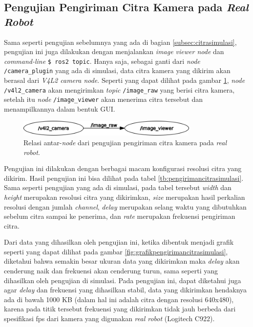 \subsection{Pengujian Pengiriman Citra Kamera pada \emph{Real Robot}}
\label{subsec:citrarobot}

Sama seperti pengujian sebelumnya yang ada di bagian \ref{subsec:citrasimulasi},
  pengujian ini juga dilakukan dengan menjalankan \emph{image viewer node} dan \emph{command-line} \lstinline{$ ros2 topic}.
Hanya saja, sebagai ganti dari \emph{node} \lstinline{/camera_plugin} yang ada di simulasi,
  data citra kamera yang dikirim akan berasal dari \emph{V4L2 camera node}.
Seperti yang dapat dilihat pada gambar \ref{fig:rosgraphcamera},
  \emph{node} \lstinline{/v4l2_camera} akan mengirimkan \emph{topic} \lstinline{/image_raw} yang berisi citra kamera,
  setelah itu \emph{node} \lstinline{/image_viewer} akan menerima citra tersebut dan menampilkannya dalam bentuk GUI.

\begin{figure}[ht]
  \centering
  \includegraphics[width=0.8\textwidth,keepaspectratio]{gambar/rosgraph-camera.png}
  \caption{Relasi antar-\emph{node} dari pengujian pengiriman citra kamera pada \emph{real robot}.}
  \label{fig:rosgraphcamera}
\end{figure}

Pengujian ini dilakukan dengan berbagai macam konfigurasi resolusi citra yang dikirim.
Hasil pengujian ini bisa dilihat pada tabel \ref{tb:pengirimancitrasimulasi}.
Sama seperti pengujian yang ada di simulasi, pada tabel tersebut \emph{width} dan \emph{height} merupakan resolusi citra yang dikirimkan,
  \emph{size} merupakan hasil perkalian resolusi dengan jumlah \emph{channel},
  \emph{delay} merupakan selang waktu yang dibutuhkan sebelum citra sampai ke penerima,
  dan \emph{rate} merupakan frekuensi pengiriman citra.

  


Dari data yang dihasilkan oleh pengujian ini,
  ketika dibentuk menjadi grafik seperti yang dapat dilihat pada gambar \ref{fig:grafikpengirimancitrasimulasi},
  diketahui bahwa semakin besar ukuran data yang dikirimkan maka \emph{delay} akan cenderung naik dan frekuensi akan cenderung turun,
  sama seperti yang dihasilkan oleh pengujian di simulasi.
Pada pengujian ini, dapat diketahui juga agar \emph{delay} dan frekuensi yang dihasilkan stabil,
  data yang dikirimkan hendaknya ada di bawah 1000 KB (dalam hal ini adalah citra dengan resolusi 640x480),
  karena pada titik tersebut frekuensi yang dikirimkan tidak jauh berbeda dari spesifikasi fps dari kamera yang digunakan \emph{real robot} (Logitech C922).
